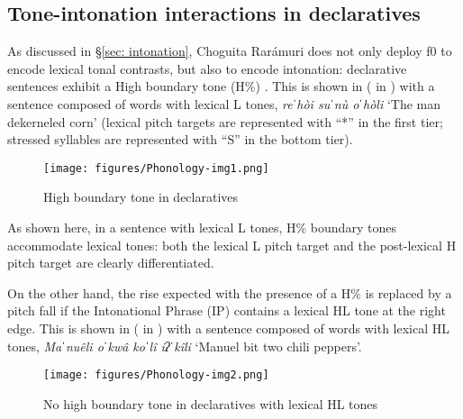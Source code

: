 \subsection{Tone-intonation interactions in declaratives}
\label{subsec: tone-intonation interactions in declarative sentences}

As discussed in §\ref{sec: intonation}, Choguita Rarámuri does not only deploy f0 to encode lexical tonal contrasts, but also to encode intonation: declarative sentences exhibit a High boundary tone (H\%) \citep{caballero2014tone, garellek2015lexical}. This is shown in  ( in ) with a sentence composed of words with lexical L tones, \textit{reˈhòi suˈnù oˈhòli} `The man dekerneled corn' (lexical pitch targets are represented with ``*'' in the first tier; stressed syllables are represented with ``S'' in the bottom tier).

\begin{figure}

\texttt{[image: figures/Phonology-img1.png]}
\caption{
\label{fig: H boundary tone in declaratives 2}
High boundary tone in declaratives \parencite{garellek2015lexical}}
\end{figure}

As shown here, in a sentence with lexical L tones, H\% boundary tones accommodate lexical tones: both the lexical L pitch target and the post-lexical H pitch target are clearly differentiated.

On the other hand, the rise expected with the presence of a H\% is replaced by a pitch fall if the Intonational Phrase (IP) contains a lexical HL tone at the right edge. This is shown in  ( in ) with a sentence composed of words with lexical HL tones, \textit{Maˈnuêli oˈkwâ koˈlî iʔˈkîli} `Manuel bit two chili peppers'.


\begin{figure}
\texttt{[image: figures/Phonology-img2.png]}
\caption{
\label{fig: no H boundary tone in declaratives with lexical HL tones 2}
No high boundary tone in declaratives with lexical HL tones \parencite{garellek2015lexical}}
\end{figure}

